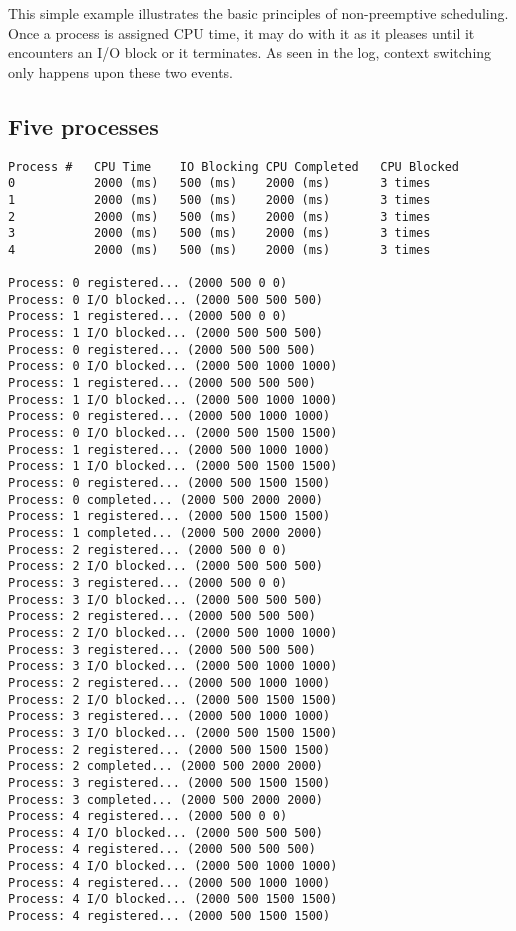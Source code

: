 \documentclass{article}
\begin{document}
	This simple example illustrates the basic principles of non-preemptive
	scheduling. Once a process is assigned CPU time, it may do with it as it
	pleases until it encounters an I/O block or it terminates. As seen in the
	log, context switching only happens upon these two events.
	
	\subsection{Five processes}
	
	    \begin{verbatim}
Process #	CPU Time	IO Blocking	CPU Completed	CPU Blocked
0			2000 (ms)	500 (ms)	2000 (ms)		3 times
1			2000 (ms)	500 (ms)	2000 (ms)		3 times
2			2000 (ms)	500 (ms)	2000 (ms)		3 times
3			2000 (ms)	500 (ms)	2000 (ms)		3 times
4			2000 (ms)	500 (ms)	2000 (ms)		3 times

Process: 0 registered... (2000 500 0 0)
Process: 0 I/O blocked... (2000 500 500 500)
Process: 1 registered... (2000 500 0 0)
Process: 1 I/O blocked... (2000 500 500 500)
Process: 0 registered... (2000 500 500 500)
Process: 0 I/O blocked... (2000 500 1000 1000)
Process: 1 registered... (2000 500 500 500)
Process: 1 I/O blocked... (2000 500 1000 1000)
Process: 0 registered... (2000 500 1000 1000)
Process: 0 I/O blocked... (2000 500 1500 1500)
Process: 1 registered... (2000 500 1000 1000)
Process: 1 I/O blocked... (2000 500 1500 1500)
Process: 0 registered... (2000 500 1500 1500)
Process: 0 completed... (2000 500 2000 2000)
Process: 1 registered... (2000 500 1500 1500)
Process: 1 completed... (2000 500 2000 2000)
Process: 2 registered... (2000 500 0 0)
Process: 2 I/O blocked... (2000 500 500 500)
Process: 3 registered... (2000 500 0 0)
Process: 3 I/O blocked... (2000 500 500 500)
Process: 2 registered... (2000 500 500 500)
Process: 2 I/O blocked... (2000 500 1000 1000)
Process: 3 registered... (2000 500 500 500)
Process: 3 I/O blocked... (2000 500 1000 1000)
Process: 2 registered... (2000 500 1000 1000)
Process: 2 I/O blocked... (2000 500 1500 1500)
Process: 3 registered... (2000 500 1000 1000)
Process: 3 I/O blocked... (2000 500 1500 1500)
Process: 2 registered... (2000 500 1500 1500)
Process: 2 completed... (2000 500 2000 2000)
Process: 3 registered... (2000 500 1500 1500)
Process: 3 completed... (2000 500 2000 2000)
Process: 4 registered... (2000 500 0 0)
Process: 4 I/O blocked... (2000 500 500 500)
Process: 4 registered... (2000 500 500 500)
Process: 4 I/O blocked... (2000 500 1000 1000)
Process: 4 registered... (2000 500 1000 1000)
Process: 4 I/O blocked... (2000 500 1500 1500)
Process: 4 registered... (2000 500 1500 1500)
    \end{verbatim}
	
\end{document}
